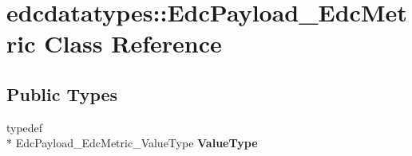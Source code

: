 \hypertarget{classedcdatatypes_1_1_edc_payload___edc_metric}{\section{edcdatatypes\-:\-:Edc\-Payload\-\_\-\-Edc\-Metric Class Reference}
\label{classedcdatatypes_1_1_edc_payload___edc_metric}
}
\subsection*{Public Types}
\begin{DoxyCompactItemize}
\item 
\hypertarget{classedcdatatypes_1_1_edc_payload___edc_metric_a72f2518d65e03c4d098cd8e3cbf47f74}{typedef \\*
Edc\-Payload\-\_\-\-Edc\-Metric\-\_\-\-Value\-Type {\bfseries Value\-Type}}\label{classedcdatatypes_1_1_edc_payload___edc_metric_a72f2518d65e03c4d098cd8e3cbf47f74}

\end{DoxyCompactItemize}
